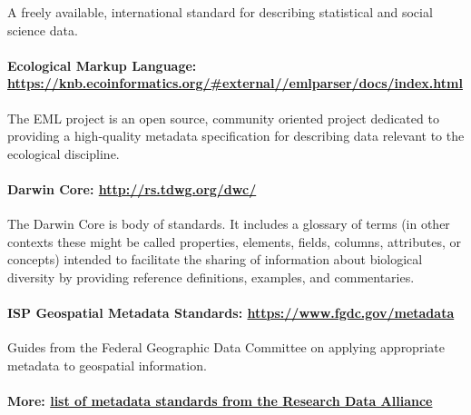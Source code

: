 A freely available, international standard for describing statistical
and social science data.

\paragraph{\texorpdfstring{Ecological Markup Language:
\url{https://knb.ecoinformatics.org/\#external//emlparser/docs/index.html}}{Ecological Markup Language: https://knb.ecoinformatics.org/\#external//emlparser/docs/index.html}}\label{ecological-markup-language-httpsknb.ecoinformatics.orgexternalemlparserdocsindex.html}

The EML project is an open source, community oriented project dedicated
to providing a high-quality metadata specification for describing data
relevant to the ecological discipline.

\paragraph{\texorpdfstring{Darwin Core:
\url{http://rs.tdwg.org/dwc/}}{Darwin Core: http://rs.tdwg.org/dwc/}}\label{darwin-core-httprs.tdwg.orgdwc}

The Darwin Core is body of standards. It includes a glossary of terms
(in other contexts these might be called properties, elements, fields,
columns, attributes, or concepts) intended to facilitate the sharing of
information about biological diversity by providing reference
definitions, examples, and commentaries.

\paragraph{\texorpdfstring{ISP Geospatial Metadata Standards:
\url{https://www.fgdc.gov/metadata}}{ISP Geospatial Metadata Standards: https://www.fgdc.gov/metadata}}\label{isp-geospatial-metadata-standards-httpswww.fgdc.govmetadata}

Guides from the Federal Geographic Data Committee on applying
appropriate metadata to geospatial information.

\paragraph{\texorpdfstring{More:
\href{http://rd-alliance.github.io/metadata-directory/}{list of metadata
standards from the Research Data
Alliance}}{More: list of metadata standards from the Research Data Alliance}}\label{more-list-of-metadata-standards-from-the-research-data-alliance}

